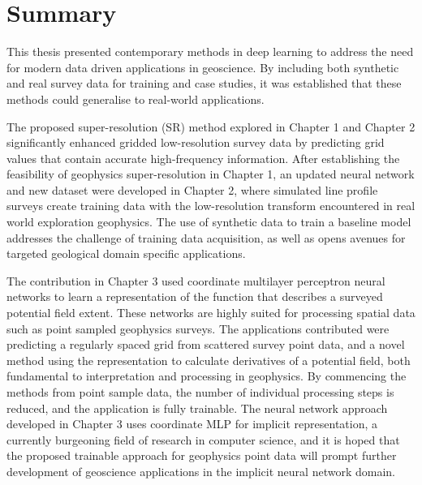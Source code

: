 \documentclass[manuscript.tex]{subfiles}
\begin{document}


\section{Summary}
This thesis presented contemporary methods in deep learning to address the need for modern data driven applications in geoscience.
By including both synthetic and real survey data for training and case studies, it was established that these methods could generalise to real-world applications.

The proposed super-resolution (SR) method explored in Chapter 1 and Chapter 2 significantly enhanced gridded low-resolution survey data by predicting grid values that contain accurate high-frequency information.
After establishing the feasibility of geophysics super-resolution in Chapter 1, an updated neural network and new dataset were developed in Chapter 2, where simulated line profile surveys create training data with the low-resolution transform encountered in real world exploration geophysics.
The use of synthetic data to train a baseline model addresses the challenge of training data acquisition, as well as opens avenues for targeted geological domain specific applications.

The contribution in Chapter 3 used coordinate multilayer perceptron neural networks to learn a representation of the function that describes a surveyed potential field extent.
These networks are highly suited for processing spatial data such as point sampled geophysics surveys.
The applications contributed were predicting a regularly spaced grid from scattered survey point data, and a novel method using the representation to calculate derivatives of a potential field, both fundamental to interpretation and processing in geophysics.
By commencing the methods from point sample data, the number of individual processing steps is reduced, and the application is fully trainable.
The neural network approach developed in Chapter 3 uses coordinate MLP for implicit representation, a currently burgeoning field of research in computer science, and it is hoped that the proposed trainable approach for geophysics point data will prompt further development of geoscience applications in the implicit neural network domain.
\end{document}
